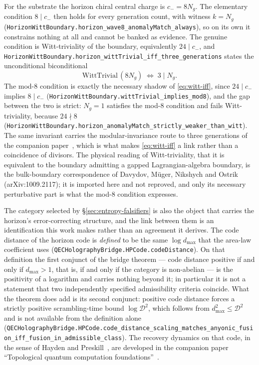 \documentclass[aps,prd,nofootinbib,superscriptaddress,12pt]{revtex4-2}
\DeclareRobustCommand{\lb}{\discretionary{}{}{}}
\begin{document}
For the substrate the horizon chiral central charge is $c_- = 8N_g$. The elementary
condition $8 \mid c_-$ then holds for every generation count, with witness $k = N_g$
(\texttt{Horizon\lb{}Witt\lb{}Boundary.\lb{}horizon\_\lb{}wave8\_\lb{}anomaly\lb{}Match\_\lb{}always}), so on its own it
constrains nothing at all and cannot be banked as evidence. The genuine condition is
Witt-triviality of the boundary, equivalently $24 \mid c_-$, and
\texttt{Horizon\lb{}Witt\lb{}Boundary.\lb{}horizon\_\lb{}witt\lb{}Trivial\_\lb{}iff\_\lb{}three\_\lb{}generations} states the
unconditional biconditional
\begin{equation}
\label{eq:witt-iff}
\mathrm{WittTrivial}\,(8N_g) \;\Longleftrightarrow\; 3 \mid N_g .
\end{equation}
The mod-$8$ condition is exactly the necessary shadow of \eqref{eq:witt-iff}, since
$24 \mid c_-$ implies $8 \mid c_-$
(\texttt{Horizon\lb{}Witt\lb{}Boundary.\lb{}witt\lb{}Trivial\_\lb{}implies\_\lb{}mod8}), and the gap between the two is
strict: $N_g = 1$ satisfies the mod-$8$ condition and fails Witt-triviality, because
$24 \nmid 8$ (\texttt{Horizon\lb{}Witt\lb{}Boundary.\lb{}horizon\_\lb{}anomaly\lb{}Match\_\lb{}strictly\_\lb{}weaker\_\lb{}than\_\lb{}witt}).
The same invariant carries the modular-invariance route to three generations of the
companion paper~\cite{Roehm2026Modular}, which is what makes \eqref{eq:witt-iff} a link
rather than a coincidence of divisors. The physical reading of Witt-triviality, that it is
equivalent to the boundary admitting a gapped Lagrangian-algebra boundary, is the
bulk-boundary correspondence of Davydov, M\"uger, Nikshych and Ostrik
(arXiv:1009.2117); it is imported here and not reproved, and only its necessary
perturbative part is what the mod-$8$ condition expresses.

The category selected by \S\ref{sec:entropy-falsifiers} is also the object that carries the
horizon's error-correcting structure, and the link between them is an identification this
work makes rather than an agreement it derives. The code distance of the horizon code is
\emph{defined} to be the same $\log d_{\max}$ that the area-law coefficient uses
(\texttt{QECHolography\lb{}Bridge.\lb{}HPCode.\lb{}code\lb{}Distance}). On that definition the
first conjunct of the bridge theorem --- code distance positive if and only if
$d_{\max} > 1$, that is, if and only if the category is non-abelian --- is the positivity
of a logarithm and carries nothing beyond it; in particular it is not a statement that two
independently specified admissibility criteria coincide. What the theorem does add is its
second conjunct: positive code distance forces a strictly positive scrambling-time bound
$\log \mathcal{D}^2$, which follows from $d_{\max}^2 \le \mathcal{D}^2$ and is not available
from the definition alone
(\texttt{QECHolography\lb{}Bridge.\lb{}HPCode.\lb{}code\_\lb{}distance\_\lb{}scaling\_\lb{}matches\_\lb{}anyonic\_\lb{}fusion\_\lb{}iff\_\lb{}fusion\_\lb{}in\_\lb{}admissible\_\lb{}class}).
The recovery dynamics on that code, in the sense of Hayden and
Preskill~\cite{HaydenPreskill2007,PastawskiYoshidaHarlowPreskill2015}, are developed in the
companion paper ``Topological quantum computation foundations''~\cite{Roehm2026TQC}.
\end{document}
